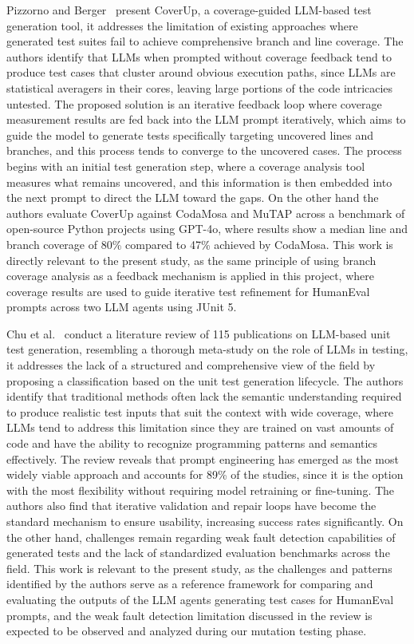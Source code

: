 \documentclass[journal]{IEEEtran}
\begin{document}
Pizzorno and Berger~\cite{coverup} present CoverUp, a coverage-guided LLM-based test generation tool, it addresses the limitation of existing approaches where generated test suites fail to achieve comprehensive branch and line coverage. The authors identify that LLMs when prompted without coverage feedback tend to produce test cases that cluster around obvious execution paths, since LLMs are statistical averagers in their cores, leaving large portions of the code intricacies untested. The proposed solution is an iterative feedback loop where coverage measurement results are fed back into the LLM prompt iteratively, which aims to guide the model to generate tests specifically targeting uncovered lines and branches, and this process tends to converge to the uncovered cases. The process begins with an initial test generation step, where a coverage analysis tool measures what remains uncovered, and this information is then embedded into the next prompt to direct the LLM toward the gaps. On the other hand the authors evaluate CoverUp against CodaMosa and MuTAP across a benchmark of open-source Python projects using GPT-4o, where results show a median line and branch coverage of 80\% compared to 47\% achieved by CodaMosa. This work is directly relevant to the present study, as the same principle of using branch coverage analysis as a feedback mechanism is applied in this project, where coverage results are used to guide iterative test refinement for HumanEval prompts across two LLM agents using JUnit 5.

Chu et al.~\cite{chusurvey} conduct a literature review of 115 publications on LLM-based unit test generation, resembling a thorough meta-study on the role of LLMs in testing, it addresses the lack of a structured and comprehensive view of the field by proposing a classification based on the unit test generation lifecycle. The authors identify that traditional methods often lack the semantic understanding required to produce realistic test inputs that suit the context with wide coverage, where LLMs tend to address this limitation since they are trained on vast amounts of code and have the ability to recognize programming patterns and semantics effectively. The review reveals that prompt engineering has emerged as the most widely viable approach and accounts for 89\% of the studies, since it is the option with the most flexibility without requiring model retraining or fine-tuning. The authors also find that iterative validation and repair loops have become the standard mechanism to ensure usability, increasing success rates significantly. On the other hand, challenges remain regarding weak fault detection capabilities of generated tests and the lack of standardized evaluation benchmarks across the field. This work is relevant to the present study, as the challenges and patterns identified by the authors serve as a reference framework for comparing and evaluating the outputs of the LLM agents generating test cases for HumanEval prompts, and the weak fault detection limitation discussed in the review is expected to be observed and analyzed during our mutation testing phase.
\end{document}
